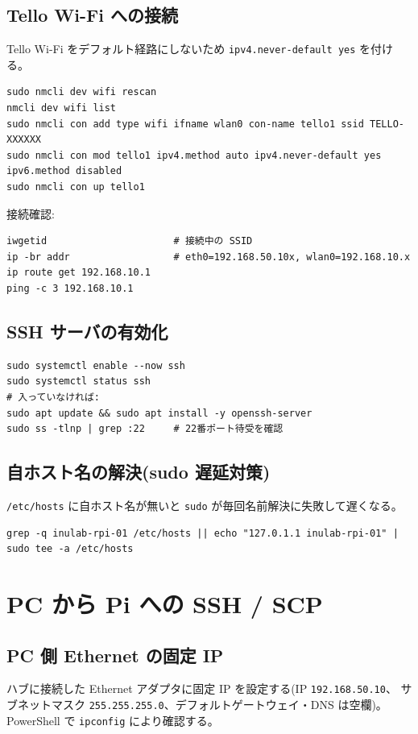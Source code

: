 \documentclass[11pt,a4paper]{ltjsarticle}
\newcommand{\code}[1]{\texttt{\small #1}}
\begin{document}
\subsection{Tello Wi-Fi への接続}
Tello Wi-Fi をデフォルト経路にしないため \code{ipv4.never-default yes} を付ける。
\begin{lstlisting}
sudo nmcli dev wifi rescan
nmcli dev wifi list
sudo nmcli con add type wifi ifname wlan0 con-name tello1 ssid TELLO-XXXXXX
sudo nmcli con mod tello1 ipv4.method auto ipv4.never-default yes ipv6.method disabled
sudo nmcli con up tello1
\end{lstlisting}
接続確認:
\begin{lstlisting}
iwgetid                      # 接続中の SSID
ip -br addr                  # eth0=192.168.50.10x, wlan0=192.168.10.x
ip route get 192.168.10.1
ping -c 3 192.168.10.1
\end{lstlisting}

\subsection{SSH サーバの有効化}
\begin{lstlisting}
sudo systemctl enable --now ssh
sudo systemctl status ssh
# 入っていなければ:
sudo apt update && sudo apt install -y openssh-server
sudo ss -tlnp | grep :22     # 22番ポート待受を確認
\end{lstlisting}

\subsection{自ホスト名の解決(sudo 遅延対策)}
\code{/etc/hosts} に自ホスト名が無いと \code{sudo} が毎回名前解決に失敗して遅くなる。
\begin{lstlisting}
grep -q inulab-rpi-01 /etc/hosts || echo "127.0.1.1 inulab-rpi-01" | sudo tee -a /etc/hosts
\end{lstlisting}

\section{PC から Pi への SSH / SCP}

\subsection{PC 側 Ethernet の固定 IP}
ハブに接続した Ethernet アダプタに固定 IP を設定する(IP \code{192.168.50.10}、
サブネットマスク \code{255.255.255.0}、デフォルトゲートウェイ・DNS は空欄)。
PowerShell で \code{ipconfig} により確認する。
\end{document}
